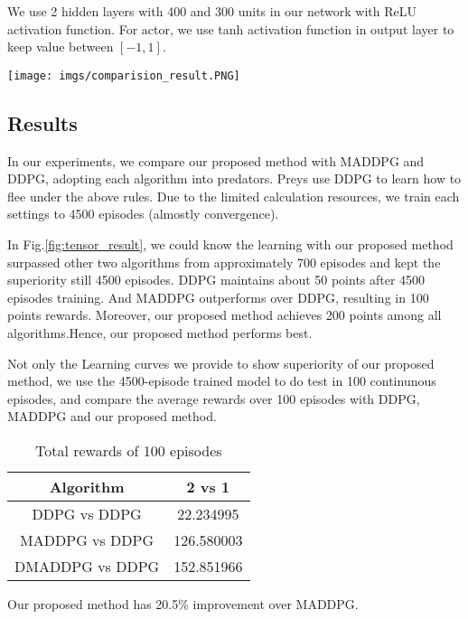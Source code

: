 \documentclass[11pt,twocolumn]{jarticle} %
\begin{document}
We use 2 hidden layers with 400 and 300 units in our network with ReLU activation function.
For actor, we use tanh activation function in output layer to keep value between $[-1, 1]$. 

\begin{figure*}[h]
 \begin{center}
  \texttt{[image: imgs/comparision\_result.PNG]}
  \caption{Reward in Learning Process}
  \label{fig:tensor_result}
 \end{center}
\end{figure*}

\subsection{Results}
In our experiments, we compare our proposed method with MADDPG and DDPG, adopting each algorithm into predators. Preys use DDPG to learn how to flee under the above rules. Due to the limited calculation resources, we train each settings to 4500 episodes (almostly convergence).  


In Fig.\ref{fig:tensor_result}, we could know the learning with our proposed method surpassed other two algorithms from approximately 700 episodes and kept the superiority still 4500 episodes. DDPG maintains about 50 points after 4500 episodes training. And MADDPG outperforms over DDPG, resulting in 100 points rewards. Moreover, our proposed method achieves 200 points among all algorithms.Hence, our proposed method performs best. \par
Not only the Learning curves we provide to show superiority of our proposed method, we use the 4500-episode trained model to do test in 100 continunous episodes, and compare the average rewards over 100 episodes with DDPG, MADDPG and our proposed method.

\begin{table}[ht]
 \caption{Total rewards of 100 episodes} 
 \label{tbl:reward}
  \begin{center}
    \begin{tabular}{|c|c|}
    \hline
    Algorithm  & 2 vs 1\\
    \hline \hline
    DDPG vs DDPG     & 22.234995  \\\hline
    MADDPG vs DDPG   & 126.580003  \\\hline
    DMADDPG vs DDPG  & 152.851966  \\\hline
    \end{tabular}
  \end{center}
\end{table}
Our proposed method has 20.5\% improvement over MADDPG.
\end{document}
